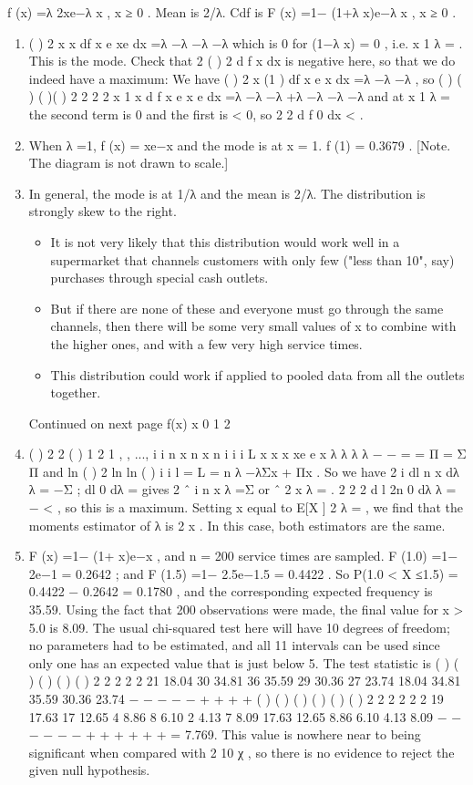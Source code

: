 \documentclass[a4paper,12pt]{article}
\begin{document}
f (x) =λ 2xe−λ x , x ≥ 0 . Mean is 2/λ. Cdf is F (x) =1− (1+λ x)e−λ x , x ≥ 0 .
\begin{enumerate}
\item  ( ) 2 { x x} df x
e xe
dx
=λ −λ −λ −λ which is 0 for (1−λ x) = 0 , i.e. x 1
λ
= . This is the
mode. Check that 2 ( )
2
d f x
dx
is negative here, so that we do indeed have a maximum:
We have ( ) 2 x (1 ) df x
e x
dx
=λ −λ −λ , so ( ) ( ) ( )( ) 2
2 2
2 x 1 x d f x
e x e
dx
=λ −λ −λ +λ −λ −λ −λ
and at x 1
λ
= the second term is 0 and the first is < 0, so
2
2 d f 0
dx
< .
\item  When λ =1, f (x) = xe−x and the mode is at x = 1. f (1) = 0.3679 .
[Note. The diagram is not drawn to scale.]
\item  In general, the mode is at 1/λ and the mean is 2/λ. The distribution is strongly
skew to the right. 
\begin{itemize}
    \item It is not very likely that this distribution would work well in a
supermarket that channels customers with only few ("less than 10", say) purchases
through special cash outlets.
\item But if there are none of these and everyone must go
through the same channels, then there will be some very small values of x to combine
with the higher ones, and with a few very high service times.
\item This distribution could
work if applied to pooled data from all the outlets together.
\end{itemize}

Continued on next page
f(x)
x
0 1 2
\item  ( ) 2 2 ( )
1 2
1
, , ..., i i
n
x n x
n i i
i
L x x x xe e x λ λ λ λ − −
=
= Π = Σ Π
and ln ( ) 2 ln ln ( ) i i l = L = n λ −λΣx + Πx .
So we have 2
i
dl n x
dλ λ
= −Σ ; dl 0
dλ
= gives 2
ˆ i
n x
λ
=Σ or ˆ 2
x
λ = .
2
2 2
d l 2n 0
dλ λ
= − < , so this is a maximum.
Setting x equal to E[X ] 2
λ
= , we find that the moments estimator of λ is 2
x
. In this
case, both estimators are the same.
\item  F (x) =1− (1+ x)e−x , and n = 200 service times are sampled.
F (1.0) =1− 2e−1 = 0.2642 ; and F (1.5) =1− 2.5e−1.5 = 0.4422 .
So P(1.0 < X ≤1.5) = 0.4422 − 0.2642 = 0.1780 , and the corresponding expected
frequency is 35.59.
Using the fact that 200 observations were made, the final value for x > 5.0 is 8.09.
The usual chi-squared test here will have 10 degrees of freedom; no parameters had
to be estimated, and all 11 intervals can be used since only one has an expected value
that is just below 5. The test statistic is
( ) ( ) ( ) ( ) ( ) 2 2 2 2 2 21 18.04 30 34.81 36 35.59 29 30.36 27 23.74
18.04 34.81 35.59 30.36 23.74
− − − − −
+ + + +
( ) ( ) ( ) ( ) ( ) ( ) 2 2 2 2 2 2 19 17.63 17 12.65 4 8.86 8 6.10 2 4.13 7 8.09
17.63 12.65 8.86 6.10 4.13 8.09
− − − − − −
+ + + + + +
= 7.769.
This value is nowhere near to being significant when compared with 2
10 χ , so there is
no evidence to reject the given null hypothesis.
\end{enumerate}
\end{document}
